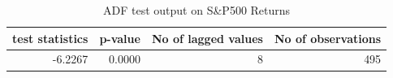 \begin{table}[!ht] 
\centering 
\resizebox{0.7\textwidth}{!} { 
\begin{tabular}{rrrr}
\toprule
test statistics & p-value & No of lagged values & No of observations \\
\midrule
-6.2267 & 0.0000 & 8 & 495 \\
\bottomrule
\end{tabular}} 
\caption {ADF test output on S\&P500 Returns} 
\label {adf_sp500} 
\end{table} 
\FloatBarrier